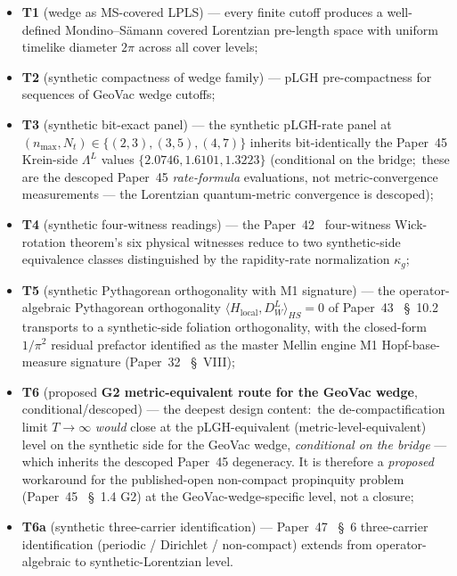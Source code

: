 \documentclass[11pt,a4paper]{article}
\theoremstyle{plain}
\theoremstyle{definition}
\newcommand{\nmax}{n_{\max}}
\newcommand{\Nt}{N_{t}}
\newcommand{\Lprop}{\Lambda^{L}}
\newcommand{\Hloc}{H_{\mathrm{local}}}
\newcommand{\Dwedge}{D_{W}^{L}}
\newcommand{\kappag}{\kappa_{g}}
\begin{document}
\begin{itemize}
\item \textbf{T1} (wedge as MS-covered LPLS) — every finite cutoff
produces a well-defined Mondino--S\"amann covered Lorentzian pre-length
space with uniform timelike diameter $2\pi$ across all cover levels;
\item \textbf{T2} (synthetic compactness of wedge family) — pLGH
pre-compactness for sequences of GeoVac wedge cutoffs;
\item \textbf{T3} (synthetic bit-exact panel) — the synthetic pLGH-rate
panel at $(\nmax,\Nt)\in\{(2,3),(3,5),(4,7)\}$ inherits bit-identically
the Paper~45 Krein-side $\Lprop$ values $\{2.0746, 1.6101, 1.3223\}$
(conditional on the bridge;\ these are the descoped Paper~45
\emph{rate-formula} evaluations, not metric-convergence measurements ---
the Lorentzian quantum-metric convergence is descoped);
\item \textbf{T4} (synthetic four-witness readings) — the
Paper~42~\cite{paper42} four-witness Wick-rotation theorem's six
physical witnesses reduce to two synthetic-side equivalence classes
distinguished by the rapidity-rate normalization $\kappag$;
\item \textbf{T5} (synthetic Pythagorean orthogonality with M1
signature) — the operator-algebraic Pythagorean orthogonality
$\langle \Hloc, \Dwedge \rangle_{HS} = 0$ of Paper~43~\cite{paper43}
\S~10.2 transports to a synthetic-side foliation orthogonality, with
the closed-form $1/\pi^{2}$ residual prefactor identified as the
master Mellin engine M1 Hopf-base-measure signature
(Paper~32~\cite{paper32} \S~VIII);
\item \textbf{T6} (proposed \textbf{G2 metric-equivalent route for the
GeoVac wedge}, conditional/descoped) — the deepest design content:\ the
de-compactification limit $T \to \infty$ \emph{would} close at the
pLGH-equivalent (metric-level-equivalent) level on the synthetic side
for the GeoVac wedge, \emph{conditional on the bridge} --- which inherits
the descoped Paper~45 degeneracy. It is therefore a \emph{proposed}
workaround for the published-open non-compact
propinquity problem (Paper~45~\cite{paper45} \S~1.4 $\mathrm{G2}$) at
the GeoVac-wedge-specific level, not a closure;
\item \textbf{T6a} (synthetic three-carrier identification) —
Paper~47~\cite{paper47} \S~6 three-carrier identification (periodic /
Dirichlet / non-compact) extends from operator-algebraic to
synthetic-Lorentzian level.
\end{itemize}
\end{document}
